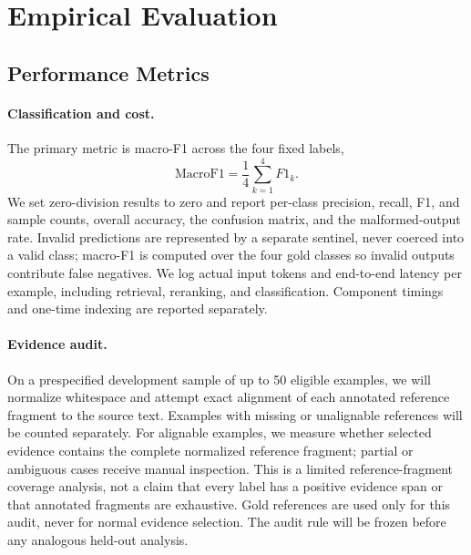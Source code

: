 \section{Empirical Evaluation}
\label{section:evaluation}
\subsection{Performance Metrics}
\paragraph{Classification and cost.}
The primary metric is macro-F1 across the four fixed labels,
\[
\mathrm{MacroF1}=\frac{1}{4}\sum_{k=1}^{4}F1_k.
\]
We set zero-division results to zero and report per-class precision, recall, F1, and sample counts, overall accuracy, the confusion matrix, and the malformed-output rate. Invalid predictions are represented by a separate sentinel, never coerced into a valid class; macro-F1 is computed over the four gold classes so invalid outputs contribute false negatives. We log actual input tokens and end-to-end latency per example, including retrieval, reranking, and classification. Component timings and one-time indexing are reported separately.

\paragraph{Evidence audit.}
On a prespecified development sample of up to 50 eligible examples, we will normalize whitespace and attempt exact alignment of each annotated reference fragment to the source text. Examples with missing or unalignable references will be counted separately. For alignable examples, we measure whether selected evidence contains the complete normalized reference fragment; partial or ambiguous cases receive manual inspection. This is a limited reference-fragment coverage analysis, not a claim that every label has a positive evidence span or that annotated fragments are exhaustive. Gold references are used only for this audit, never for normal evidence selection. The audit rule will be frozen before any analogous held-out analysis.

